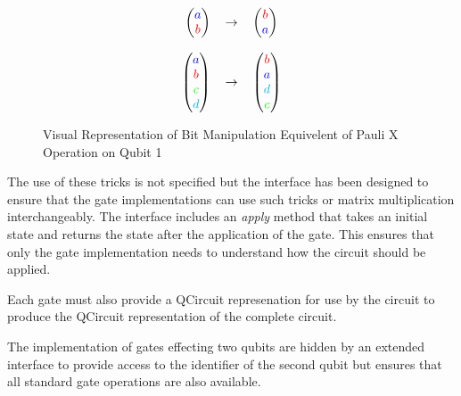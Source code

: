\begin{figure}
\[
\begin{tabular}{ r c l }
  \(\begin {pmatrix}
    \textcolor{blue}{a}\\
    \textcolor{red}{b}
  \end{pmatrix}\) 
& 
  \(\rightarrow\) 
& 
  \(\begin {pmatrix}
    \textcolor{red}{b}\\
    \textcolor{blue}{a}
  \end{pmatrix}\) \\

\\

  \(\begin {pmatrix}
    \textcolor{blue}{a}\\
    \textcolor{red}{b}\\
    \textcolor{green}{c}\\
    \textcolor{cyan}{d}
  \end{pmatrix}\)
  & \(\rightarrow\)
  & \(\begin {pmatrix}
    \textcolor{red}{b}\\
    \textcolor{blue}{a}\\
    \textcolor{cyan}{d}\\
    \textcolor{green}{c}
  \end{pmatrix}\) \\
\end{tabular}
\]
\label{eq:paulixcheaptrickvisual}
\caption{Visual Representation of Bit Manipulation Equivelent of Pauli X Operation on Qubit 1}
\end{figure}

The use of these tricks is not specified but the interface has been designed to ensure that the gate implementations can use such tricks or matrix multiplication interchangeably.
The interface includes an \emph{apply} method that takes an initial state and returns the state after the application of the gate.
This ensures that only the gate implementation needs to understand how the circuit should be applied.

Each gate must also provide a QCircuit represenation for use by the circuit to produce the QCircuit representation of the complete circuit.

The implementation of gates effecting two qubits are hidden by an extended interface to provide access to the identifier of the second qubit but ensures that all standard gate operations are also available.

